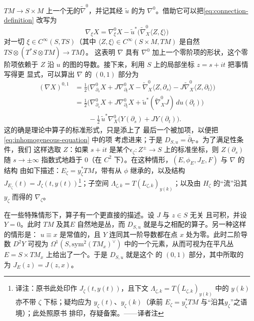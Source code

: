 $TM\to S\times M$ 上一个无\trTorsion{}的\trConnection{}$\widetilde\nabla^0$，并记其经
$\tilde u$ 的\trPullback{}为 $\nabla^0$。借助它可以把\eqref{eq:connection-definition}
改写为
\begin{equation*}
\nabla_\xi X=\nabla^0_\xi X-\tilde u^*\bigl(\widetilde\nabla^0_X\langle Z,\xi\rangle\bigr)
\end{equation*}
对一切 $\xi\in C^\infty(S,TS)$（其中 $\langle Z,\xi\rangle\in
C^\infty(S\times M,TM)$ 是自然\trPairing{}$TS\otimes(T^*S\otimes TM)\to TM$）。
这表明 $\nabla$ 具有 $\nabla^0$ 加上一个零阶项的形状，这个零阶项依赖于 $Z$ 沿 $u$
的图的导数。接下来，利用 $S$ 上的局部\trHolomorphic{}坐标 $z=s+it$ 把事情写得更
显式，可以算出 $\nabla$ 的 $(0,1)$ 部分为
\begin{equation*}
\begin{split}
(\nabla X)^{0,1}
&=\tfrac12\bigl(\nabla^0_{\partial_s}X+J\nabla^0_{\partial_t}X
-\widetilde\nabla^0_X\langle Z,\partial_s\rangle
-J\widetilde\nabla^0_X\langle Z,\partial_t\rangle\bigr)\\
&=\tfrac12\bigl(\nabla^0_{\partial_s}X+J\nabla^0_{\partial_t}X
+\tilde u^*(\widetilde\nabla^0_XJ)\,du(\partial_t)\bigr)\\
&\qquad-\tfrac12\,\tilde u^*\nabla^0_X\bigl(Y(\partial_s)+JY(\partial_t)\bigr).
\end{split}
\end{equation*}
这的确是\trPseudoholomorphicMap{}理论中\trLinearization{}算子的标准形式，只是添上了
最后一个被加项，以便把\eqref{eq:inhomogeneous-equation} 中的\trInhomogeneous{}项
考虑进来；于是 $D_{S,u}=\bar\partial_\nabla$。为了满足\trAdmissible{}性条件，我们
这样选取 $Z$：如果 $s+it$ 是某个\trStriplikeEnd{}$\epsilon_\zeta\colon Z^\pm\to S$
上的标准坐标，则 $Z(\partial_s)$ 随 $s\to\pm\infty$ 指数式地趋于 $0$（在 $C^2$
\trTopology{}下）。在这种情形，$(E,\phi_E,J_E,F)$ 与 $\nabla$ 的\trAsymptotic{}结构
由如下\trLimitingDatum{}描述：\trVectorBundle{}$E_\zeta=y_\zeta^*TM$，带有从
$\phi$ 继承的\trSymplecticStructure，以及\trAlmostComplex{}结构
$J_{E_\zeta}(t)=J_\zeta(t,y(t))$\footnote{译注：原书此处印作
$J_\zeta(t,y(t))$，且下文 $\Lambda_{\zeta,k}=T(L_{\zeta,k})_{y(k)}$ 中的 $y(k)$
亦不带 $\zeta$ 下标；疑均应为 $y_\zeta(t)$、$y_\zeta(k)$（承前
$E_\zeta=y_\zeta^*TM$ 与“沿其\trIntegralCurve{}$y_\zeta$”之语境）；此处照原书
排印，存疑备案。——译者注}；\trLagrange{}子空间
$\Lambda_{\zeta,k}=T(L_{\zeta,k})_{y(k)}$；以及由 $H_\zeta$ 的“流”沿其%
\trIntegralCurve{}$y_\zeta$ \trLinearization{}而得的\trSymplectic\trConnection{}%
$\nabla_\zeta$。
\begin{remark}\label{thm:linearization-special-cases}
在一些特殊情形下，\trLinearization{}算子有一个更直接的描述。设 $J$ 与 $z\in S$ 无关
且可积，并设 $Y=0$。此时 $TM$ 及其\trPullback{}$E$ 自然地是\trHolomorphic{}丛，而
$D_{S,u}$ 就是与之相配的\trCanonical{}\trDolbeault{}算子。另一种这样的情形是：
$u\equiv x$ 是常值的，且 $Y$ 连同其一阶导数都在点 $x$ 处为零。此时二阶导数 $D^2Y$
可视为 $\Omega^1(S,\mathrm{sym}^2(TM_x)^\vee)$ 中的一个元素，从而可视为在平凡丛
$E=S\times TM_x$ 上给出了一个\trSymplectic\trConnection。于是 $D_{S,u}$ 就是这个%
\trConnection{}的 $(0,1)$ 部分，其中所取的\trComplexStructure{}为 $J_E(z)=J(z,x)$。
\end{remark}
